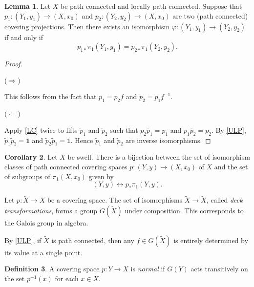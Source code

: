 \documentclass[10pt,letterpaper,cm]{nupset}
\theoremstyle{definition}
\newtheorem{definition}{Definition}[subsection]
\theoremstyle{theorem}
\newtheorem{lemma}[definition]{Lemma}
\newtheorem{corollary}[definition]{Corollary}
\theoremstyle{remark}
\newcommand{\1}{\mathbb{1}}
\newcommand{\0}{\vec 0}
\begin{document}
\begin{lemma}
Let $X$ be path connected and locally path connected. Suppose that $p_1:(Y_1, y_1) \to \left(X, x_0\right)$ and $p_2 : (Y_2, y_2) \to \left(X, x_0\right)$ are two (path connected) covering projections. Then there exists an isomorphism $\varphi : (Y_1, y_1) \to (Y_2, y_2)$ if and only if  $$p_{1\ast} \pi_1(Y_1, y_1) = p_{2 \ast} \pi_1(Y_2, y_2).$$
\end{lemma}
\begin{proof} $ $
\smallskip

 ($\Longrightarrow$)

This follows from the fact that $p_1 = p_2f$ and $p_2 = p_1f^{-1}$. 

\medskip

 ($\Longleftarrow$) 
 
 Apply \cref{LC} twice to lifts $\tilde{p}_1$ and $\tilde{p}_2$ such that $p_2\tilde{p_1} = p_1$ and $p_1\tilde{p_2}=p_2$. By \cref{ULP}, $\tilde{p}_1\tilde{p}_2=\1$ and $\tilde{p}_2\tilde{p}_1 = \1$. Hence $\tilde{p}_1$ and $\tilde{p}_2$ are inverse isomorphisms. 
\end{proof}

\begin{corollary}
Let $X$ be swell. There is a bijection between the set of isomorphism classes of path connected covering spaces $p: (Y, y) \to \left(X, x_0\right)$ of $X$ and the set of subgroups of $\pi_1\left(X, x_0\right)$ given by $$(Y, y) \longleftrightarrow p_{\ast}\pi_1(Y, y)    .$$
\end{corollary}

\smallskip

Let $p: \widetilde{X} \to X$ be a covering space. The set of isomorphisms $\widetilde{X}  \to \widetilde{X} $, called \textit{deck transformations}, forms a group $G(\widetilde{X})$ under composition. This corresponds to the Galois group in algebra.

By \cref{ULP}, if $\widetilde{X}$ is path connected, then any $f\in G(\widetilde{X})$ is entirely determined by its value at a single point.

\begin{definition}
A covering space $p:Y \to X$ is \textit{normal} if $G(Y)$ acts transitively on the set $p^{-1}(x)$ for each $x\in X$.
\end{definition}
\end{document}
